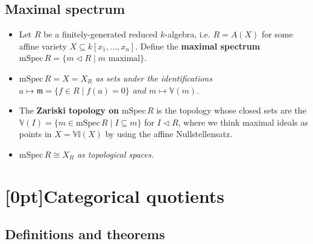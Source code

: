 \documentclass[10pt]{article}
\newcommand{\van}{\mathbb{V}}
\newcommand{\ide}{\mathbb{I}}
\newcommand{\kon}{{k[x_1,\ldots,x_n]}}
\newcommand{\AG}{\textcolor{green}{AG}}
\begin{document}
        \subsection{Maximal spectrum}

            \begin{itemize}
                \item Let $R$ be a finitely-generated reduced $k$-algebra, i.e. $R=A(X)$ for some affine variety $X\subseteq\kon$.
                Define the \textbf{maximal spectrum} $\mathrm{mSpec}\,R=\{m\triangleleft R\mid m\text{ maximal}\}$.
                \item \emph{$\mathrm{mSpec\,}R=X=X_R$ as sets under the identifications $a\mapsto\mathfrak{m}=\{f\in R\mid f(a)=0\}$ and $m\mapsto\van(m)$.}
                \item The \textbf{Zariski topology on} $\mathrm{mSpec\,}R$ is the topology whose closed sets are the $\van(I)=\{m\in\mathrm{mSpec\,}R\mid I\subseteq m\}$ for $I\triangleleft R$, where we think maximal ideals as points in $X=\van\ide(X)$ by using the affine Nullstellensatz.
                \item \emph{$\mathrm{mSpec\,}R\cong X_R$ as topological spaces.}
            \end{itemize}

    \section{\protect\marginnote{\AG}[0pt]Categorical quotients}

        \subsection{Definitions and theorems}
\end{document}
